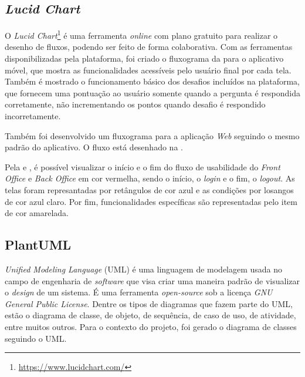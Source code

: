 \subsection{\textit{Lucid Chart}}
\label{lucidChart}

O \textit{Lucid Chart}\footnote{\url{https://www.lucidchart.com/}} é uma ferramenta \textit{online} com plano gratuito para realizar o desenho de fluxos, podendo ser feito de forma colaborativa. Com as ferramentas disponibilizadas pela plataforma, foi criado o fluxograma da  para o aplicativo móvel, que mostra as funcionalidades acessíveis pelo usuário final por cada tela. Também é mostrado o funcionamento básico dos desafios incluídos na plataforma, que fornecem uma pontuação ao usuário somente quando a pergunta é respondida corretamente, não incrementando os pontos quando desafio é respondido incorretamente.


Também foi desenvolvido um fluxograma para a aplicação \textit{Web} seguindo o mesmo padrão do aplicativo. O fluxo está desenhado na .


Pela  e , é possível visualizar o início e o fim do fluxo de usabilidade do \textit{Front Office} e \textit{Back Office} em cor vermelha, sendo o início, o \textit{login} e o fim, o \textit{logout}. As telas foram represantadas por retângulos de cor azul e as condições por losangos de cor azul claro. Por fim, funcionalidades específicas são representadas pelo item de cor amarelada.

\subsection{PlantUML}
\label{plantuml}

\textit{Unified Modeling Language} (UML) \cite{uml} é uma linguagem de modelagem usada no campo de engenharia de \textit{software} que visa criar uma maneira padrão de visualizar o \textit{design} de um sistema.  É uma ferramenta \textit{open-source} sob a licença \textit{GNU General Public License}. Dentre os tipos de diagramas que fazem parte do UML, estão o diagrama de classe, de objeto, de sequência, de caso de uso, de atividade, entre muitos outros. Para o contexto do projeto, foi gerado o diagrama de classes seguindo o UML.

